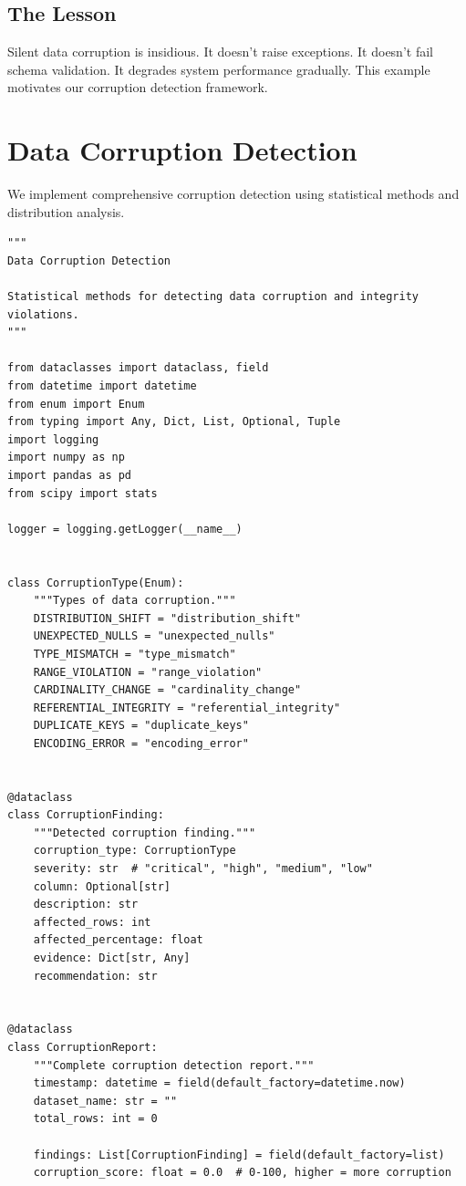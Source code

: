 \subsection{The Lesson}

Silent data corruption is insidious. It doesn't raise exceptions. It doesn't fail schema validation. It degrades system performance gradually. This example motivates our corruption detection framework.

\section{Data Corruption Detection}

We implement comprehensive corruption detection using statistical methods and distribution analysis.

\begin{lstlisting}[style=python, caption={Data corruption detection framework}]
"""
Data Corruption Detection

Statistical methods for detecting data corruption and integrity violations.
"""

from dataclasses import dataclass, field
from datetime import datetime
from enum import Enum
from typing import Any, Dict, List, Optional, Tuple
import logging
import numpy as np
import pandas as pd
from scipy import stats

logger = logging.getLogger(__name__)


class CorruptionType(Enum):
    """Types of data corruption."""
    DISTRIBUTION_SHIFT = "distribution_shift"
    UNEXPECTED_NULLS = "unexpected_nulls"
    TYPE_MISMATCH = "type_mismatch"
    RANGE_VIOLATION = "range_violation"
    CARDINALITY_CHANGE = "cardinality_change"
    REFERENTIAL_INTEGRITY = "referential_integrity"
    DUPLICATE_KEYS = "duplicate_keys"
    ENCODING_ERROR = "encoding_error"


@dataclass
class CorruptionFinding:
    """Detected corruption finding."""
    corruption_type: CorruptionType
    severity: str  # "critical", "high", "medium", "low"
    column: Optional[str]
    description: str
    affected_rows: int
    affected_percentage: float
    evidence: Dict[str, Any]
    recommendation: str


@dataclass
class CorruptionReport:
    """Complete corruption detection report."""
    timestamp: datetime = field(default_factory=datetime.now)
    dataset_name: str = ""
    total_rows: int = 0

    findings: List[CorruptionFinding] = field(default_factory=list)
    corruption_score: float = 0.0  # 0-100, higher = more corruption


\end{lstlisting}
